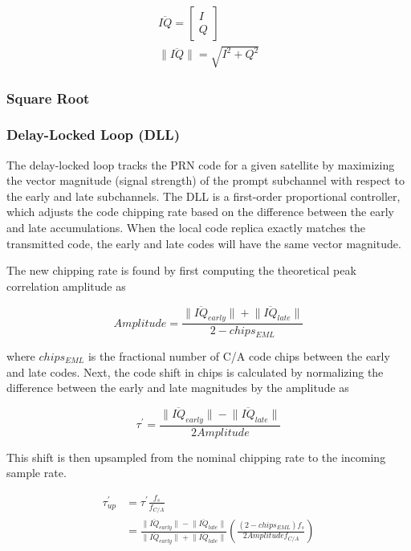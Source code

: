 \documentclass[12pt]{article}
\begin{document}
\begin{gather}
\label{eqn:iq}
\overline{IQ}=
\left[ \begin{matrix}
  I \\
  Q
\end{matrix} \right] \\
\lVert \overline{IQ} \rVert=\sqrt{I^2+Q^2} \nonumber
\end{gather}

\subsubsection{Square Root}
\label{sec:square root}

\subsubsection{Delay-Locked Loop (DLL)}
The delay-locked loop tracks the PRN code for a given satellite by maximizing the vector magnitude (signal strength) of the prompt subchannel with respect to the early and late subchannels. The DLL is a first-order proportional controller, which adjusts the code chipping rate based on the difference between the early and late accumulations. When the local code replica exactly matches the transmitted code, the early and late codes will have the same vector magnitude.

The new chipping rate is found by first computing the theoretical peak correlation amplitude as

\begin{equation}
Amplitude = \frac{\lVert \overline{IQ}_{early} \rVert + \lVert \overline{IQ}_{late} \rVert}{2-chips_{EML}}
\end{equation}

where $chips_{EML}$ is the fractional number of C/A code chips between the early and late codes. Next, the code shift in chips is calculated by normalizing the difference between the early and late magnitudes by the amplitude as

\begin{equation*}
\tau^\prime = \frac{\lVert \overline{IQ}_{early} \rVert - \lVert \overline{IQ}_{late} \rVert}{2 Amplitude}
\end{equation*}

This shift is then upsampled from the nominal chipping rate to the incoming sample rate.

\begin{align}
\label{eqn:tau prime up}
\tau^\prime_{up} &= \tau^\prime \frac{f_{s}}{f_{C/A}} \nonumber \\
&= \frac{\lVert \overline{IQ}_{early} \rVert - \lVert \overline{IQ}_{late} \rVert}{\lVert \overline{IQ}_{early} \rVert + \lVert \overline{IQ}_{late} \rVert} \left( \frac{(2-chips_{EML})f_s}{2 Amplitude f_{C/A}} \right)
\end{align}
\end{document}
